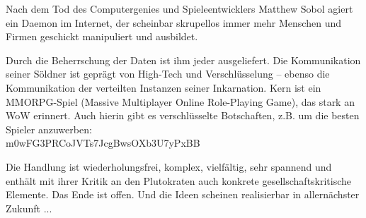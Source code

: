 \begin{description}
    Nach dem Tod des Computergenies und Spieleentwicklers Matthew Sobol agiert ein Daemon
    im Internet, der scheinbar skrupellos immer mehr Menschen und Firmen geschickt
    manipuliert und ausbildet.

    Durch die Beherrschung der Daten ist ihm jeder ausgeliefert. Die Kommunikation seiner
    Söldner ist geprägt von High-Tech und Verschlüsselung -- ebenso die Kommunikation der
    verteilten Instanzen seiner Inkarnation. Kern ist ein MMORPG-Spiel (Massive
    Multiplayer Online Role-Playing Game), das stark an WoW erinnert. Auch hierin gibt es
    verschlüsselte Botschaften, z.B. um die besten Spieler anzuwerben:\\
	m0wFG3PRCoJVTs7JcgBwsOXb3U7yPxBB

    Die Handlung ist wiederholungsfrei, komplex, vielfältig, sehr spannend und enthält mit
    ihrer Kritik an den Plutokraten auch konkrete gesellschaftskritische Elemente.
    Das Ende ist offen. Und die Ideen scheinen realisierbar in allernächster Zukunft ...\\





\end{description}
